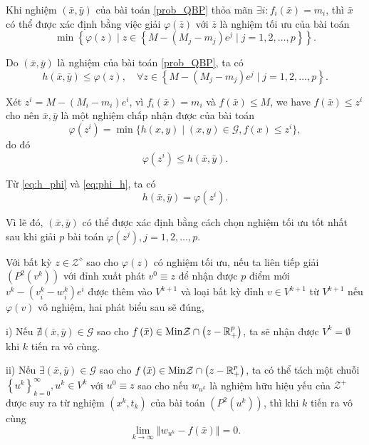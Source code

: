 \begin{bd}\label{lem-sol_at_border} Khi nghiệm $(\bar{x},\bar{y})$
của bài toán \ref{prob_QBP} thỏa mãn $\exists i:f_{i}\left(\bar{x}\right)=m_{i}$,
thì $\bar{x}$ có thể được xác định bằng việc giải $\varphi\left(\bar{z}\right)$ với $\bar{z}$ là nghiệm tối ưu của bài toán
\[
\min\left\{ \varphi\left(z\right)\mid z\in\left\{ M-\left(M_{j}-m_{j}\right)e^{j}\mid j=1,2,\dots,p\right\} \right\} .
\]
\end{bd}
\begin{cm} Do $(\bar{x},\bar{y})$ là nghiệm của bài toán \ref{prob_QBP}, ta có
\begin{equation}
h\left(\bar{x},\bar{y}\right)\leq\varphi\left(z\right),\quad\forall z\in\left\{ M-\left(M_{j}-m_{j}\right)e^{j}\mid j=1,2,\dots,p\right\} .\label{eq:h_phi}
\end{equation}

Xét $z^{i}=M-\left(M_{i}-m_{i}\right)e^{i}$, vì $f_{i}\left(\bar{x}\right)=m_{i}$ và $f\left(\bar{x}\right)\leq M$, we have $f\left(\bar{x}\right)\leq z^{i}$
cho nên $\bar{x},\bar{y}$ là một nghiệm chấp nhận được của bài toán
\[
\varphi\left(z^{i}\right)=\min\{h(x,y)\mid (x,y)\in \mathcal{G},f(x)\leq z^{i}\},
\]
do đó
\begin{equation}
\varphi\left(z^{i}\right)\leq h\left(\bar{x},\bar{y}\right).\label{eq:phi_h}
\end{equation}

Từ \ref{eq:h_phi} và \ref{eq:phi_h}, ta có
\[
h\left(\bar{x},\bar{y}\right)=\varphi\left(z^{i}\right).
\]

Vì lẽ đó, $(\bar{x},\bar{y})$ có thể được xác định bằng cách chọn nghiệm tối ưu tốt nhất sau khi giải $p$ bài toán $\varphi\left(z^{j}\right),j=1,2,\dots,p$.
\end{cm}

\begin{bd}\label{lem-sol_on_MinZ} Với bất kỳ $z\in\mathcal{Z}^{\diamond}$
sao cho $\varphi\left(z\right)$ có nghiệm tối ưu, nếu ta liên tiếp giải $\left(P^{2}\left(v^{k}\right)\right)$ với đỉnh xuất phát $v^{0}\equiv z$
để nhận được $p$ điểm mới $v^{k}-(v_{i}^{k}-w_{i}^{k})e^{i}$ được thêm vào $V^{k+1}$ và loại bất kỳ đỉnh $v\in V^{k+1}$ từ $V^{k+1}$ nếu $\varphi\left(v\right)$ vô nghiệm, hai phát biểu sau sẽ đúng,

i) Nếu $\nexists(\bar{x},\bar{y})\in \mathcal{G}$ sao cho $f\left(\bar{x}\right)\in{\rm Min}\mathcal{Z}\cap\left(z-\mathbb{R}_{+}^{p}\right)$,
ta sẽ nhận được $V^{k}=\emptyset$ khi $k$ tiến ra vô cùng.

ii) Nếu $\exists(\bar{x},\bar{y})\in \mathcal{G}$ sao cho $f\left(\bar{x}\right)\in{\rm Min}\mathcal{Z}\cap\left(z-\mathbb{R}_{+}^{p}\right)$,
ta có thể tách một chuỗi $\left\{ u^{k}\right\} _{k=0}^{\infty},u^{k}\in V^{k}$ với $u^{0}\equiv z$ sao cho nếu $w_{u^{k}}$ là nghiệm hữu hiệu yếu của $\mathcal{Z}^{+}$ được suy ra từ nghiệm $\left(x^{k},t_{k}\right)$
của bài toán $(P^{2}(u^{k}))$, thì khi $k$ tiến ra vô cùng
\[
\lim_{k\rightarrow\infty}\left\Vert w_{u^{k}}-f\left(\bar{x}\right)\right\Vert =0.
\]

\end{bd}

